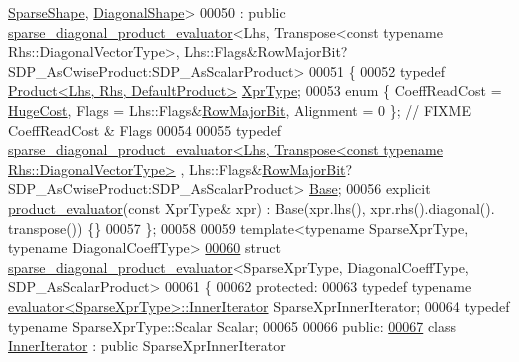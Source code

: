 \begin{DoxyCode}
      \hyperlink{struct_eigen_1_1_sparse_shape}{SparseShape}, \hyperlink{struct_eigen_1_1_diagonal_shape}{DiagonalShape}>
00050   : \textcolor{keyword}{public} \hyperlink{struct_eigen_1_1internal_1_1sparse__diagonal__product__evaluator}{sparse\_diagonal\_product\_evaluator}<Lhs, Transpose<const typename
       Rhs::DiagonalVectorType>, Lhs::Flags&RowMajorBit?SDP\_AsCwiseProduct:SDP\_AsScalarProduct>
00051 \{
00052   \textcolor{keyword}{typedef} \hyperlink{group___core___module_class_eigen_1_1_product}{Product<Lhs, Rhs, DefaultProduct>} 
      \hyperlink{group___core___module_class_eigen_1_1_product}{XprType};
00053   \textcolor{keyword}{enum} \{ CoeffReadCost = \hyperlink{namespace_eigen_a3163430a1c13173faffde69016b48aaf}{HugeCost}, Flags = Lhs::Flags&\hyperlink{group__flags_gae4f56c2a60bbe4bd2e44c5b19cbe8762}{RowMajorBit}, Alignment = 0 \}; \textcolor{comment}{//
       FIXME CoeffReadCost & Flags}
00054   
00055   \textcolor{keyword}{typedef} 
      \hyperlink{struct_eigen_1_1internal_1_1sparse__diagonal__product__evaluator}{sparse\_diagonal\_product\_evaluator<Lhs, Transpose<const typename Rhs::DiagonalVectorType>}
      , Lhs::Flags&\hyperlink{group__flags_gae4f56c2a60bbe4bd2e44c5b19cbe8762}{RowMajorBit}?SDP\_AsCwiseProduct:SDP\_AsScalarProduct> \hyperlink{struct_eigen_1_1internal_1_1sparse__diagonal__product__evaluator}{Base};
00056   \textcolor{keyword}{explicit} \hyperlink{struct_eigen_1_1internal_1_1product__evaluator}{product\_evaluator}(\textcolor{keyword}{const} XprType& xpr) : Base(xpr.lhs(), xpr.rhs().diagonal().
      transpose()) \{\}
00057 \};
00058 
00059 \textcolor{keyword}{template}<\textcolor{keyword}{typename} SparseXprType, \textcolor{keyword}{typename} DiagonalCoeffType>
\hyperlink{struct_eigen_1_1internal_1_1sparse__diagonal__product__evaluator_3_01_sparse_xpr_type_00_01_diag3ebd66799ce02a814119c716700b9642}{00060} \textcolor{keyword}{struct }\hyperlink{struct_eigen_1_1internal_1_1sparse__diagonal__product__evaluator}{sparse\_diagonal\_product\_evaluator}<SparseXprType, DiagonalCoeffType,
       SDP\_AsScalarProduct>
00061 \{
00062 \textcolor{keyword}{protected}:
00063   \textcolor{keyword}{typedef} \textcolor{keyword}{typename} \hyperlink{struct_eigen_1_1internal_1_1evaluator}{evaluator<SparseXprType>::InnerIterator} 
      SparseXprInnerIterator;
00064   \textcolor{keyword}{typedef} \textcolor{keyword}{typename} SparseXprType::Scalar Scalar;
00065   
00066 \textcolor{keyword}{public}:
\hyperlink{class_eigen_1_1internal_1_1sparse__diagonal__product__evaluator_3_01_sparse_xpr_type_00_01_diagocbb91bd40f7346bf4110a7aa087884f6}{00067}   \textcolor{keyword}{class }\hyperlink{class_eigen_1_1_inner_iterator}{InnerIterator} : \textcolor{keyword}{public} SparseXprInnerIterator

\end{DoxyCode}
